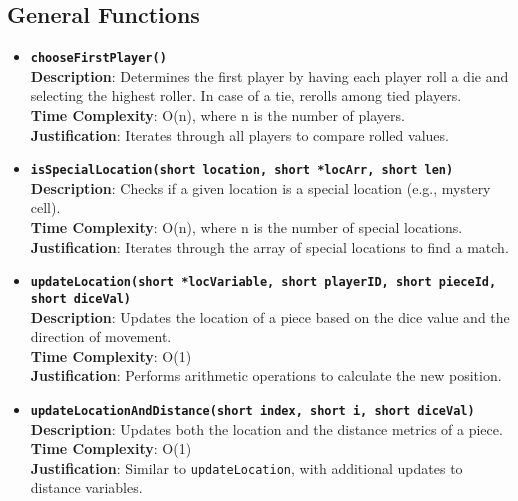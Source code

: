\documentclass{article}
\begin{document}
    \subsection{General Functions}
    
    \begin{itemize}
        \item \textbf{\texttt{chooseFirstPlayer()}}\\
        \textbf{Description}: Determines the first player by having each player roll a die and selecting the highest roller. In case of a tie, rerolls among tied players.\\
        \textbf{Time Complexity}: O(n), where n is the number of players.\\
        \textbf{Justification}: Iterates through all players to compare rolled values.
        
        \item \textbf{\texttt{isSpecialLocation(short location, short *locArr, short len)}}\\
        \textbf{Description}: Checks if a given location is a special location (e.g., mystery cell).\\
        \textbf{Time Complexity}: O(n), where n is the number of special locations.\\
        \textbf{Justification}: Iterates through the array of special locations to find a match.
        
        \item \textbf{\texttt{updateLocation(short *locVariable, short playerID, short pieceId, short diceVal)}}\\
        \textbf{Description}: Updates the location of a piece based on the dice value and the direction of movement.\\
        \textbf{Time Complexity}: O(1)\\
        \textbf{Justification}: Performs arithmetic operations to calculate the new position.
        
        \item \textbf{\texttt{updateLocationAndDistance(short index, short i, short diceVal)}}\\
        \textbf{Description}: Updates both the location and the distance metrics of a piece.\\
        \textbf{Time Complexity}: O(1)\\
        \textbf{Justification}: Similar to \texttt{updateLocation}, with additional updates to distance variables.
    \end{itemize}
    
\end{document}
